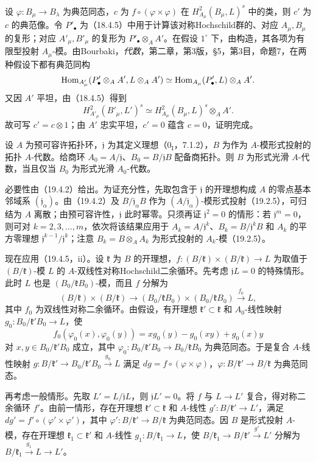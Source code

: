 设 $\varphi:B_\mu\to B_\lambda$ 为典范同态，$c$ 为 $f\circ(\varphi\times\varphi)$ 在 $H^2_{A_\mu}(B_\mu,L)^s$ 中的类，则 $c'$ 为 $c$ 的典范像。令 $P'_\bullet$ 为（18.4.5）中用于计算该对称Hochschild群的、对应 $A_\mu,B_\mu$ 的复形；对应 $A'_\mu,B'_\mu$ 的复形为 $P'_\bullet\otimes_AA'$。在假设 $1^\circ$ 下，由构造，其各项为有限型投射 $A_\mu$-模。由Bourbaki，\textit{代数}，第二章，第3版，§5，第3目，命题7，在两种假设下都有典范同构
\[
 \operatorname{Hom}_{A'_\mu}(P'_\bullet\otimes_AA',L\otimes_AA')
 \simeq\operatorname{Hom}_{A_\mu}(P'_\bullet,L)\otimes_AA'.
\]
又因 $A'$ 平坦，由（18.4.5）得到
\[
 H^2_{A'_\mu}(B'_\mu,L')^s
 \simeq H^2_{A_\mu}(B_\mu,L)^s\otimes_AA'.
\]
故可写 $c'=c\otimes1$；由 $A'$ 忠实平坦，$c'=0$ 蕴含 $c=0$，证明完成。

设 $A$ 为预可容许拓扑环，$\mathfrak j$ 为其定义理想（$0_{\mathrm I}$，7.1.2），$B$ 为作为 $A$-模形式投射的拓扑 $A$-代数。给商环 $A_0=A/\mathfrak j$、$B_0=B/\mathfrak jB$ 配备商拓扑。则 $B$ 为形式光滑 $A$-代数，当且仅当 $B_0$ 为形式光滑 $A_0$-代数。

必要性由（19.4.2）给出。为证充分性，先取包含于 $\mathfrak j$ 的开理想构成 $A$ 的零点基本邻域系 $(\mathfrak j_\alpha)$。由（19.4.2）及 $B/\mathfrak j_\alpha B$ 作为 $(A/\mathfrak j_\alpha)$-模形式投射（19.2.5），可归结为 $A$ 离散；由预可容许性，$\mathfrak j$ 此时幂零。只须再证 $\mathfrak j^2=0$ 的情形：若 $\mathfrak j^m=0$，则可对 $k=2,3,\ldots,m$，依次将该结果应用于
$A_k=A/\mathfrak j^k$、$B_k=B/\mathfrak j^kB$ 和 $A_k$ 的平方零理想 $\mathfrak j^{k-1}/\mathfrak j^k$；注意 $B_k=B\otimes_AA_k$ 为形式投射的 $A_k$-模（19.2.5）。

现在应用（19.4.5，ii）。设 $\mathfrak k$ 为 $B$ 的开理想，$f:(B/\mathfrak k)\times(B/\mathfrak k)\to L$ 为取值于 $(B/\mathfrak k)$-模 $L$ 的 $A$-双线性对称Hochschild二余循环。先考虑 $\mathfrak jL=0$ 的特殊情形。此时 $L$ 也是 $(B_0/\mathfrak kB_0)$-模，而且 $f$ 分解为
\[
 (B/\mathfrak k)\times(B/\mathfrak k)
 \longrightarrow(B_0/\mathfrak kB_0)\times(B_0/\mathfrak kB_0)
 \xrightarrow{f_0}L,
\]
其中 $f_0$ 为双线性对称二余循环。由假设，有开理想 $\mathfrak k'\subset\mathfrak k$ 和 $A_0$-线性映射 $g_0:B_0/\mathfrak k'B_0\to L$，使
\[
 f_0(\varphi_0(x),\varphi_0(y))=xg_0(y)-g_0(xy)+g_0(x)y
\]
对 $x,y\in B_0/\mathfrak k'B_0$ 成立，其中 $\varphi_0:B_0/\mathfrak k'B_0\to B_0/\mathfrak kB_0$ 为典范同态。于是复合 $A$-线性映射 $g:B/\mathfrak k'\to B_0/\mathfrak k'B_0\xrightarrow{g_0}L$ 满足 $dg=f\circ(\varphi\times\varphi)$，$\varphi:B/\mathfrak k'\to B/\mathfrak k$ 为典范同态。

再考虑一般情形。先取 $L'=L/\mathfrak jL$，则 $\mathfrak jL'=0$。将 $f$ 与 $L\to L'$ 复合，得对称二余循环 $f'$。由前一情形，存在开理想 $\mathfrak k'\subset\mathfrak k$ 和 $A$-线性 $g':B/\mathfrak k'\to L'$，满足 $dg'=f'\circ(\varphi'\times\varphi')$，其中 $\varphi':B/\mathfrak k'\to B/\mathfrak k$ 为典范同态。因 $B$ 是形式投射 $A$-模，存在开理想 $\mathfrak k_1\subset\mathfrak k'$ 和 $A$-线性 $g_1:B/\mathfrak k_1\to L$，使 $B/\mathfrak k_1\to B/\mathfrak k'\xrightarrow{g'}L'$ 分解为 $B/\mathfrak k_1\xrightarrow{g_1}L\to L'$。

